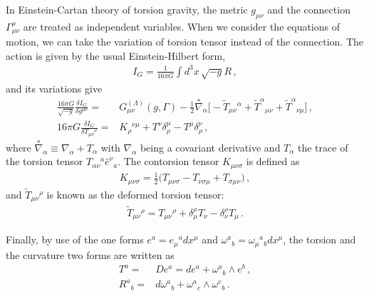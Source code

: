 \documentclass[11pt]{article}
\numberwithin{equation}{section}
\begin{document}
In Einstein-Cartan theory of torsion gravity, the metric $g_{\mu\nu}$
and the connection $\Gamma_{\mu\nu}^\rho$ are treated as independent variables.
When we consider the equations of motion, we can take the variation of torsion tensor
instead of the connection.
The action is given by the usual Einstein-Hilbert form,
\begin{align}
  I_G= \frac{1}{16 \pi G} \int d^3 x \, \sqrt{-g} R \,,
\end{align}
and its variations give
\begin{align}
\frac{16\pi G}{\sqrt{-g}} \frac{\delta I_G}{\delta g^{\mu\nu}}=&
  G_{\mu\nu}^{(\Lambda)}(g,\Gamma) -\frac{1}{2}  \overset{*}{\nabla}_\alpha
\big[- \tilde{T}_{\mu\nu}{}^\alpha+\tilde{T}^\alpha{}_{\mu\nu}+\tilde{T}^\alpha{}_{\nu\mu} \big] \,,\\
16\pi G \frac{\delta I_G}{\delta T_{\mu\nu}{}^\rho}=&
K_\rho{}^{\nu\mu}+T^\nu\delta^\mu_\rho-T^\mu\delta^\nu_\rho \,,
\end{align}
where $\overset{*}{\nabla}_\alpha \equiv \nabla_\alpha + T_\alpha$
with $\nabla_\alpha$ being a covariant derivative 
and $T_\alpha$ the trace of the torsion tensor
$T_{\alpha\nu}{}^a \hat{e}^\nu{}_a$.
The contorsion tensor $K_{\mu\nu\sigma}$ is defined as
\begin{align}
  K_{\mu\nu\sigma} = \frac{1}{2} \big(T_{\mu\nu\sigma} - T_{\nu\sigma\mu} + T_{\sigma\mu\nu}  \big) \,,
\end{align}
and
$\tilde{T}_{\mu\nu}{}^\rho$ is known as the deformed torsion tensor:
\begin{align}
  \tilde{T}_{\mu\nu}{}^\rho= T_{\mu\nu}{}^\rho + \delta^\rho_\mu T_\nu -
  \delta^\rho_\nu T_\mu 
\,.
\end{align}

Finally, by use of the one forms $e^a=e_\mu{}^a dx^\mu$ and $\omega^a{}_b=\omega_\mu{}^a{}_b dx^\mu$,
the torsion and the curvature two forms are written as 
\begin{align}
  T^a=& De^a=de^a + \omega^a{}_b \wedge e^b \,,\\
R^a{}_b =& d\omega^a{}_b + \omega^a{}_c \wedge \omega^c{}_b \,.
\end{align}


\end{document}
